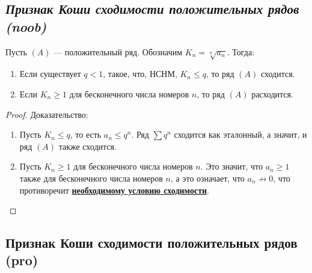 \subsection{\itshape Признак Коши сходимости положительных рядов (noob)} \hypertarget{Коши-нуб}{}

\begin{theorem}
	Пусть \((A)\) --- положительный ряд. Обозначим \(K_n = \sqrt[n]{a_n}\). Тогда:
	\begin{enumerate}
		\item Если существует \(q < 1\), такое, что, НСНМ, \(K_n \leqslant q\), то ряд \((A)\) сходится.
		\item Если \(K_n \geqslant 1\) для бесконечного числа номеров \(n\), то ряд \((A)\) расходится.
	\end{enumerate}
\end{theorem}
\begin{proof}
	Доказательство:
	\begin{enumerate}
		\item Пусть  \(K_n \leqslant q\), то есть \(a_n \leqslant q^n\). Ряд \(\sum q^n\) сходится как эталонный, а значит, и ряд \((A)\) также сходится.
		\item Пусть \(K_n \geqslant 1\) для бесконечного числа номеров \(n\). Это значит, что \(a_n \geqslant 1\) также для бесконечного числа номеров \(n\), а это означает, что \(a_n \not\to 0\), что противоречит \hyperlink{необходимое условие сходимости}{\bfseries необходимому условию сходимости}.
	\end{enumerate}
\end{proof}

\subsection{Признак Коши сходимости положительных рядов (pro)} \hypertarget{Коши-про}{}

